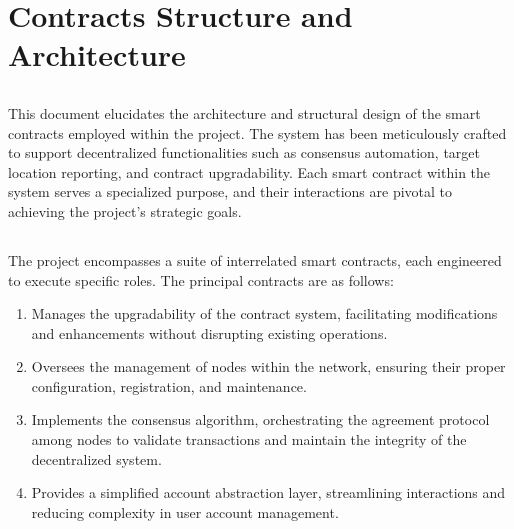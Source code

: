\documentclass[a4paper,10pt,english]{sphinxmanual}
\let\sphinxpxdimen\pdfpxdimen\else\newdimen\sphinxpxdimen
\begin{document}
\section{Contracts Structure and Architecture}
\label{\detokenize{contracts_structure:contracts-structure-and-architecture}}

\subsection{}
\label{\detokenize{contracts_structure:introduction}}
\sphinxAtStartPar
This document elucidates the architecture and structural design of the smart contracts employed within the project. The system has been meticulously crafted to support decentralized functionalities such as consensus automation, target location reporting, and contract upgradability. Each smart contract within the system serves a specialized purpose, and their interactions are pivotal to achieving the project’s strategic goals.

\noindent{\hspace*{\fill}\sphinxincludegraphics[width=600\sphinxpxdimen]{{network-architecture}.png}\hspace*{\fill}}


\subsection{}
\label{\detokenize{contracts_structure:contract-overview}}
\sphinxAtStartPar
The project encompasses a suite of interrelated smart contracts, each engineered to execute specific roles. The principal contracts are as follows:
\begin{enumerate}
%
\item {} 
\sphinxAtStartPar
{}
\sphinxhyphen{} Manages the upgradability of the contract system, facilitating modifications and enhancements without disrupting existing operations.

\item {} 
\sphinxAtStartPar
{}
\sphinxhyphen{} Oversees the management of nodes within the network, ensuring their proper configuration, registration, and maintenance.

\item {} 
\sphinxAtStartPar
{}
\sphinxhyphen{} Implements the consensus algorithm, orchestrating the agreement protocol among nodes to validate transactions and maintain the integrity of the decentralized system.

\item {} 
\sphinxAtStartPar
{}
\sphinxhyphen{} Provides a simplified account abstraction layer, streamlining interactions and reducing complexity in user account management.

\end{enumerate}
\end{document}
